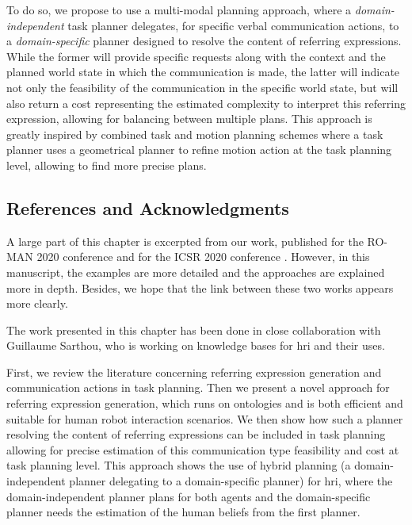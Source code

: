 \documentclass[a4paper,11pt,twoside]{StyleThese}
\begin{document}
To do so, we propose to use a multi-modal planning approach, where a \textit{domain-independent} task planner delegates, for specific verbal communication actions, to a \textit{domain-specific} planner designed to resolve the content of referring expressions. While the former will provide specific requests along with the context and the planned world state in which the communication is made, the latter will indicate not only the feasibility of the communication in the specific world state, but will also return a cost representing the estimated complexity to interpret this referring expression, allowing for balancing between multiple plans. This approach is greatly inspired by combined task and motion planning schemes \cite{gharbi2015combining} where a task planner uses a geometrical planner to refine motion action at the task planning level, allowing to find more precise plans.

\subsection{References and Acknowledgments}
A large part of this chapter is excerpted from our work, published for the RO-MAN 2020 conference \cite{buisan2020efficient} and for the ICSR 2020 conference \cite{buisan2020human}. However, in this manuscript, the examples are more detailed and the approaches are explained more in depth. Besides, we hope that the link between these two works appears more clearly.

The work presented in this chapter has been done in close collaboration with Guillaume Sarthou, who is working on knowledge bases for \acrshort{hri} and their uses.

\medskip

First, we review the literature concerning referring expression generation and communication actions in task planning. Then we present a novel approach for referring expression generation, which runs on ontologies and is both efficient and suitable for human robot interaction scenarios. We then show how such a planner resolving the content of referring expressions can be included in task planning allowing for precise estimation of this communication type feasibility and cost at task planning level. This approach shows the use of hybrid planning (a domain-independent planner delegating to a domain-specific planner) for \acrshort{hri}, where the domain-independent planner plans for both agents and the domain-specific planner needs the estimation of the human beliefs from the first planner.
\end{document}
